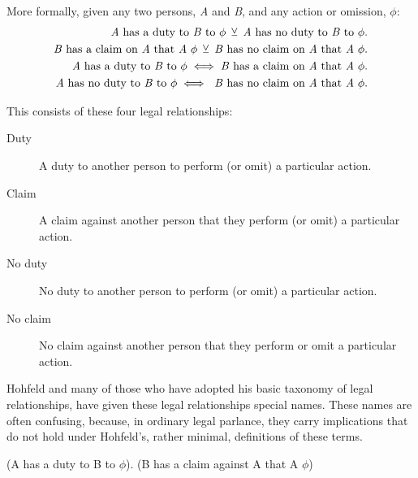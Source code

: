 More formally, given any two persons, \emph{A} and \emph{B}, and any action or omission,
\(\phi\): \[\begin{aligned} \text{\emph{A} has a duty to \emph{B} to }\phi\:
    \veebar\: \text{\emph{A} has no duty to \emph{B} to }\phi.
    \\ \text{\emph{B} has a claim on \emph{A} that \emph{A} }\phi{}\: \veebar\:
    \text{\emph{B} has no claim on \emph{A} that \emph{A} }\phi{}.
    \\ \text{\emph{A} has a duty to \emph{B} to }\phi \iff \text{\emph{B} has a
    claim on \emph{A} that \emph{A} }\phi.
    \\ \text{\emph{A} has no duty to \emph{B} to }\phi \iff \text{ \emph{B} has no
    claim on \emph{A} that \emph{A} }\phi.
    \end{aligned}\]

This consists of these four legal relationships:

\begin{description}
\item[{Duty}] A duty to another person to perform (or omit) a particular action.

\item[{Claim}] A claim against another person that they perform (or omit) a
particular action.

\item[{No duty}] No duty to another person to perform (or omit) a particular action.

\item[{No claim}] No claim against another person that they perform or omit a
particular action.
\end{description}

Hohfeld and many of those who have adopted his basic taxonomy of legal
relationships, have given these legal relationships special names.
These names are often confusing, because, in ordinary legal parlance, they carry
implications that do not hold under Hohfeld's, rather minimal, definitions of
these terms.

(A has a duty to B to \(\phi\)).
(B has a claim against A that A \(\phi\))
